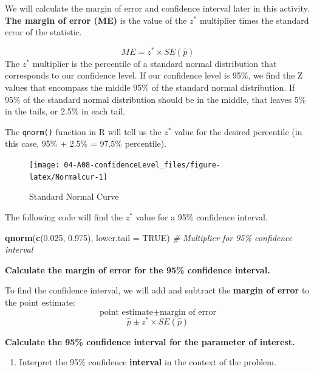\documentclass[
]{report}
\newenvironment{Shaded}{\begin{snugshade}}{\end{snugshade}}
\newcommand{\AttributeTok}[1]{\textcolor[rgb]{0.13,0.29,0.53}{#1}}
\newcommand{\CommentTok}[1]{\textcolor[rgb]{0.56,0.35,0.01}{\textit{#1}}}
\newcommand{\ConstantTok}[1]{\textcolor[rgb]{0.56,0.35,0.01}{#1}}
\newcommand{\FloatTok}[1]{\textcolor[rgb]{0.00,0.00,0.81}{#1}}
\newcommand{\FunctionTok}[1]{\textcolor[rgb]{0.13,0.29,0.53}{\textbf{#1}}}
\newcommand{\NormalTok}[1]{#1}
\providecommand{\tightlist}{%
  \setlength{\itemsep}{0pt}\setlength{\parskip}{0pt}}
\begin{document}
\vspace{0.5in}

We will calculate the margin of error and confidence interval later in this activity. \textbf{The margin of error (ME)} is the value of the \(z^*\) multiplier times the standard error of the statistic.

\[ME = z^* \times SE(\hat{p})\]
The \(z^*\) multiplier is the percentile of a standard normal distribution that corresponds to our confidence level. If our confidence level is 95\%, we find the Z values that encompass the middle 95\% of the standard normal distribution. If 95\% of the standard normal distribution should be in the middle, that leaves 5\% in the tails, or 2.5\% in each tail.

The \texttt{qnorm()} function in R will tell us the \(z^*\) value for the desired percentile (in this case, 95\% + 2.5\% = 97.5\% percentile).

\begin{figure}

{\centering \texttt{[image: 04-A08-confidenceLevel\_files/figure-latex/Normalcur-1]} 

}

\caption{Standard Normal Curve}\label{fig:Normalcur}
\end{figure}

The following code will find the \(z^*\) value for a 95\% confidence interval.

\begin{Shaded}
\begin{Highlighting}[]
\FunctionTok{qnorm}\NormalTok{(}\FunctionTok{c}\NormalTok{(}\FloatTok{0.025}\NormalTok{, }\FloatTok{0.975}\NormalTok{), }\AttributeTok{lower.tail =} \ConstantTok{TRUE}\NormalTok{) }\CommentTok{\# Multiplier for 95\% confidence interval}
\end{Highlighting}
\end{Shaded}

\textbf{Calculate the margin of error for the 95\% confidence interval.}
\vspace{0.6in}

To find the confidence interval, we will add and subtract the \textbf{margin of error} to the point estimate:
\[\text{point estimate}\pm\text{margin of error}\]
\[\hat{p}\pm z^* \times SE(\hat{p})\]

\textbf{Calculate the 95\% confidence interval for the parameter of interest.}
\vspace{0.6in}

\begin{enumerate}
\def\labelenumi{\arabic{enumi}.}
\setcounter{enumi}{5}
\tightlist
\item
  Interpret the 95\% confidence \textbf{interval} in the context of the problem.
  \vspace{1in}
\end{enumerate}
\end{document}
